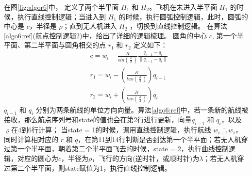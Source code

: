    在图\ref{fig:algor6}中，
    定义了两个半平面 \textit{$H_{1}$} 和 \textit{$H_{2}$}。飞机在未进入半平面 \textit{$H_{1}$}
    的时候，执行直线控制逻辑；当进入到 \textit{$H_{1}$} 的时候，执行圆弧控制逻辑，此时，圆弧的中心是 $c$，半径是 $\rho$；直到无人机进入 \textit{$H_{2}$} ，切换到直线控制逻辑。
    在算法\ref{algo6:ref}(航点控制逻辑2)中，给出了详细的逻辑梳理。
    圆角的中心 $c$, 第一个半平面、第二半平面与圆角相交的点 $r_{1}$ 和 $r_{2}$ 定义如下：
        \begin{align}
            &c = w_{i} - \frac{R}{sin(\frac{\varrho}{2})} \frac{q_{i-1}-q_{i}}{\lVert q_{i-1}-q_{i} \rVert} \\
            &r_{1} = w_{i} - \left( \frac{R}{tan(\frac{\varrho}{2})} \right)q_{i-1} \\
            &r_{2} = w_{i} + \left( \frac{R}{tan(\frac{\varrho}{2})} \right)q_{i}
        \end{align}
     $q_{i-1}$ 和 $q_{i}$ 分别为两条航线的单位方向向量。算法\ref{algo6:ref}中，若一条新的航线被接收，那么航点序列号和state的值也会在第2行进行更新，向量$q_{i-1}$ 和 $q_{i}$，以及$\varrho$在4到6行计算；
    当state = 1的时候，调用直线控制逻辑，执行航线 $\overline{w_{i-1}w_{i}}$，同时计算相对应的 $r$ 和 $q$，在第11到14行判断是否到达第一个半平面；若无人机穿过第一个半平面，朝着第二个半平面飞去的时候，state = 2，执行曲线控制逻辑，对应的圆心为$c$，半径为$\rho$，飞行的方向(逆时针，或顺时针)为$\lambda$；若无人机穿过第二个半平面，则state赋值为1，执行直线控制逻辑。

    
